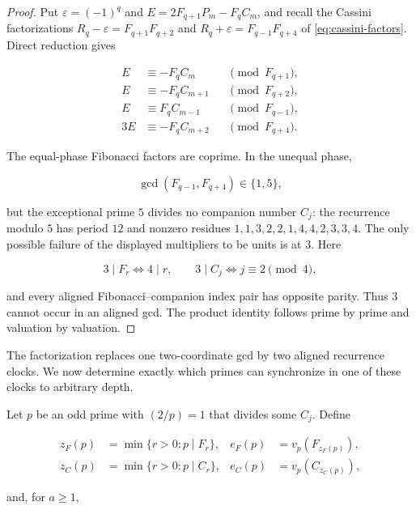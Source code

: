 \begin{proof}
Put $\varepsilon=(-1)^q$ and
$E=2F_{q+1}P_m-F_qC_m$, and recall the Cassini factorizations
$R_q-\varepsilon=F_{q+1}F_{q+2}$ and $R_q+\varepsilon=F_{q-1}F_{q+4}$ of
\cref{eq:cassini-factors}. Direct reduction gives

\begin{equation}
\begin{aligned}
 E&\equiv-F_qC_m&&\pmod {F_{q+1}},\\
 E&\equiv-F_qC_{m+1}&&\pmod {F_{q+2}},\\
 E&\equiv F_qC_{m-1}&&\pmod {F_{q-1}},\\
 3E&\equiv-F_qC_{m+2}&&\pmod {F_{q+4}}.
\end{aligned}
\label{eq:local-companion-reductions}
\end{equation}

The equal-phase Fibonacci factors are coprime. In the unequal phase,

\[
 \gcd(F_{q-1},F_{q+4})\in\{1,5\},
\]

but the exceptional prime $5$ divides no companion number $C_j$: the
recurrence modulo $5$ has period $12$ and nonzero residues
$1,1,3,2,2,1,4,4,2,3,3,4$. The only possible failure of the displayed
multipliers to be units is at $3$. Here

\[
 3\mid F_r\Longleftrightarrow4\mid r,
 \qquad
 3\mid C_j\Longleftrightarrow j\equiv2\pmod4,
\]

and every aligned Fibonacci--companion index pair has opposite parity.
Thus $3$ cannot occur in an aligned gcd. The product identity follows prime
by prime and valuation by valuation.
\end{proof}

The factorization replaces one two-coordinate gcd by two aligned recurrence
clocks. We now determine exactly which primes can synchronize in one of
these clocks to arbitrary depth.

Let $p$ be an odd prime with $(2/p)=1$ that divides some $C_j$. Define

\begin{equation}
\begin{aligned}
 z_F(p)&=\min\{r>0:p\mid F_r\},
 &e_F(p)&=v_p(F_{z_F(p)}),\\
 z_C(p)&=\min\{r>0:p\mid C_r\},
 &e_C(p)&=v_p(C_{z_C(p)}),
\end{aligned}
\label{eq:local-ranks}
\end{equation}

and, for $a\geqslant1$,

